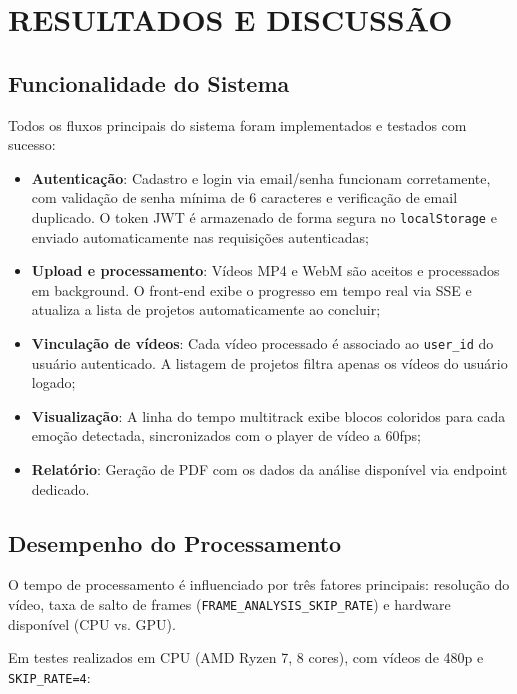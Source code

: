 \documentclass[
	12pt,
	openright,
	oneside,
	a4paper,
	english,
	brazil
	]{abntex2}
\begin{document}
\chapter{RESULTADOS E DISCUSSÃO}
\label{cap:resultados}

\section{Funcionalidade do Sistema}

Todos os fluxos principais do sistema foram implementados e testados com sucesso:

\begin{itemize}
    \item \textbf{Autenticação}: Cadastro e login via email/senha funcionam corretamente, com validação de senha mínima de 6 caracteres e verificação de email duplicado. O token JWT é armazenado de forma segura no \texttt{localStorage} e enviado automaticamente nas requisições autenticadas;
    \item \textbf{Upload e processamento}: Vídeos MP4 e WebM são aceitos e processados em background. O front-end exibe o progresso em tempo real via SSE e atualiza a lista de projetos automaticamente ao concluir;
    \item \textbf{Vinculação de vídeos}: Cada vídeo processado é associado ao \texttt{user\_id} do usuário autenticado. A listagem de projetos filtra apenas os vídeos do usuário logado;
    \item \textbf{Visualização}: A linha do tempo multitrack exibe blocos coloridos para cada emoção detectada, sincronizados com o player de vídeo a 60fps;
    \item \textbf{Relatório}: Geração de PDF com os dados da análise disponível via endpoint dedicado.
\end{itemize}

\section{Desempenho do Processamento}

O tempo de processamento é influenciado por três fatores principais: resolução do vídeo, taxa de salto de frames (\texttt{FRAME\_ANALYSIS\_SKIP\_RATE}) e hardware disponível (CPU vs. GPU).

Em testes realizados em CPU (AMD Ryzen 7, 8 cores), com vídeos de 480p e \texttt{SKIP\_RATE=4}:
\end{document}
